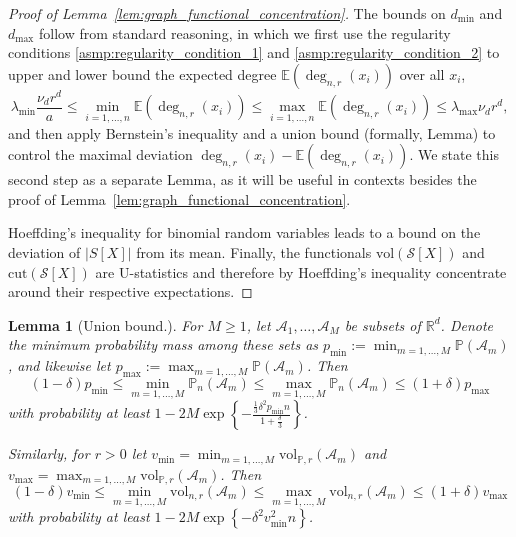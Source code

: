 \documentclass[11pt,twoside]{article}
\newtheorem{lemma}{Lemma}
\newcommand{\set}[1]{\left\{#1\right\}}
\newcommand{\vol}{\mathrm{vol}}
\newcommand{\abs}[1]{\left \lvert #1 \right \rvert}
\newcommand{\Reals}{\mathbb{R}}
\newcommand{\1}{\mathbf{1}}
\newcommand{\Pbb}{\mathbb{P}}
\begin{document}
\begin{proof}[Proof of Lemma~\ref{lem:graph_functional_concentration}]
The bounds on $d_{\min}$ and $d_{\max}$ follow from standard reasoning, in which we first use the regularity conditions \ref{asmp:regularity_condition_1} and \ref{asmp:regularity_condition_2} to upper and lower bound the expected degree $\mathbb{E}(\deg_{n,r}(x_i))$ over all $x_i$,
\begin{equation*}
\lambda_{\min} \frac{\nu_d r^d}{a} \leq \min_{i = 1,\ldots,n} \mathbb{E}(\deg_{n,r}(x_i)) \leq \max_{i = 1,\ldots,n} \mathbb{E}(\deg_{n,r}(x_i)) \leq \lambda_{\max} \nu_d r^d,
\end{equation*}
and then apply Bernstein's inequality and a union bound (formally, Lemma) to control the maximal deviation $\deg_{n,r}(x_i) - \mathbb{E}(\deg_{n,r}(x_i))$. We state this second step as a separate Lemma, as it will be useful in contexts besides the proof of Lemma~\ref{lem:graph_functional_concentration}.

Hoeffding's inequality for binomial random variables leads to a bound on the deviation of $\abs{S[X]}$ from its mean. Finally, the functionals $\vol(\mathcal{S}[X])$ and $\mathrm{cut}(\mathcal{S}[X])$ are U-statistics and therefore by Hoeffding's inequality concentrate around their respective expectations.
\end{proof}

\begin{lemma}[Union bound.]
	\label{lem:bernstein_union}
	For $M \geq 1$, let $\mathcal{A}_1,\ldots,\mathcal{A}_M$ be subsets of $\Reals^d$. Denote the minimum probability mass among these sets as $p_{\min} := \min_{m = 1,\ldots,M} \Pbb(\mathcal{A}_m)$, and likewise let $p_{\max} := \max_{m = 1,\ldots,M} \Pbb(\mathcal{A}_m)$. Then
	\begin{equation*}
	(1 - \delta)p_{\min} \leq \min_{m = 1,\ldots,M} \Pbb_n(\mathcal{A}_m) \leq \max_{m = 1,\ldots,M} \Pbb_n(\mathcal{A}_m) \leq (1 + \delta)p_{\max}
	\end{equation*}
	with probability at least $1 - 2 M \exp\left\{-\frac{\frac{1}{3}\delta^2p_{\min}n}{1 + \frac{\delta}{3}}\right\}$. 
	
	Similarly, for $r > 0$ let $v_{\min} = \min_{m = 1,\ldots,M} \vol_{\Pbb,r}(\mathcal{A}_m)$ and $v_{\max} = \max_{m = 1,\ldots,M} \vol_{\Pbb,r}(\mathcal{A}_m)$. Then
	\begin{equation*}
	(1 - \delta)v_{\min} \leq \min_{m = 1,\ldots,M} \vol_{n,r}(\mathcal{A}_m) \leq \max_{m = 1,\ldots,M} \vol_{n,r}(\mathcal{A}_m) \leq (1 + \delta)v_{\max}
	\end{equation*}
	with probability at least $1 - 2M \exp\set{-\delta^2 v_{\min}^2n}$. 
\end{lemma}
\end{document}
